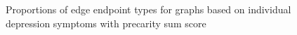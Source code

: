 \documentclass[
]{article}
\begin{document}
\begin{figure}


\caption{\label{fig-presum-mat}Proportions of edge endpoint types for
graphs based on individual depression symptoms with precarity sum score}

\end{figure}%
\end{document}
